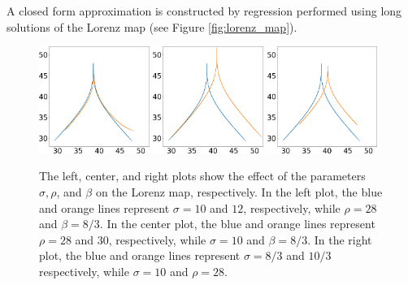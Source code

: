 A closed form approximation is constructed by regression performed using long solutions 
of the Lorenz map (see Figure \ref{fig:lorenz_map}). 
\begin{figure}
    \centering
    \includegraphics[width=0.32\textwidth]{figure/lorenz_zmax_sigma.png}
    \hspace{0.005\textwidth}
    \includegraphics[width=0.32\textwidth]{figure/lorenz_zmax_rho.png}
    \hspace{0.005\textwidth}
    \includegraphics[width=0.32\textwidth]{figure/lorenz_zmax_beta.png}
    \caption{The left, center, and right plots show the effect of the
    parameters $\sigma, \rho$, and $\beta$ on the Lorenz map, respectively.
    In the left plot, the blue and orange lines represent
    $\sigma=10$ and $12$, respectively, while $\rho  = 28$ and $\beta = 8/3.$
    In the center plot, the blue and orange lines represent
    $\rho=28$ and $30$, respectively, while $\sigma = 10$ and $\beta  = 8/3.$ 
    In the right plot, the blue and orange lines represent
    $\sigma=8/3$ and $10/3$ respectively, while $\sigma = 10$ and $\rho = 28.$}
    \label{fig:lorenz_params}
\end{figure}

